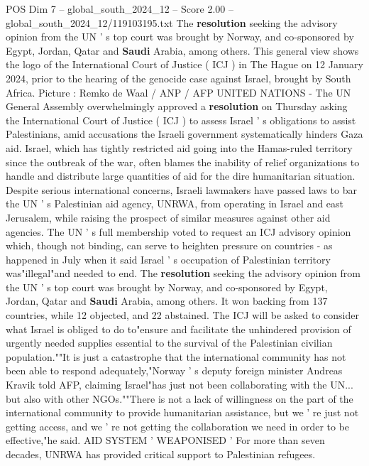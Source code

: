 \begin{textsample}{POS Dim 7 – global\_south\_2024\_12 – Score 2.00 – global\_south\_2024\_12/119103195.txt}  \label{ex:f7_pos_150}
The \textbf{resolution} seeking the advisory opinion from the UN ' s top court was brought by Norway, and co-sponsored by Egypt, Jordan, Qatar and \textbf{Saudi} Arabia, among others.
This general view shows the logo of the International Court of Justice ( ICJ ) in The Hague on 12 January 2024, prior to the hearing of the genocide case against Israel, brought by South Africa.
Picture : Remko de Waal / ANP / AFP UNITED NATIONS - The UN General Assembly overwhelmingly approved a \textbf{resolution} on Thursday asking the International Court of Justice ( ICJ ) to assess Israel ' s obligations to assist Palestinians, amid accusations the Israeli government systematically hinders Gaza aid.
Israel, which has tightly restricted aid going into the Hamas-ruled territory since the outbreak of the war, often blames the inability of relief organizations to handle and distribute large quantities of aid for the dire humanitarian situation.
Despite serious international concerns, Israeli lawmakers have passed laws to bar the UN ' s Palestinian aid agency, UNRWA, from operating in Israel and east Jerusalem, while raising the prospect of similar measures against other aid agencies.
The UN ' s full membership voted to request an ICJ advisory opinion which, though not binding, can serve to heighten pressure on countries - as happened in July when it said Israel ' s occupation of Palestinian territory was"illegal"and needed to end.
The \textbf{resolution} seeking the advisory opinion from the UN ' s top court was brought by Norway, and co-sponsored by Egypt, Jordan, Qatar and \textbf{Saudi} Arabia, among others.
It won backing from 137 countries, while 12 objected, and 22 abstained.
The ICJ will be asked to consider what Israel is obliged to do to"ensure and facilitate the unhindered provision of urgently needed supplies essential to the survival of the Palestinian civilian population.""It is just a catastrophe that the international community has not been able to respond adequately,"Norway ' s deputy foreign minister Andreas Kravik told AFP, claiming Israel"has just not been collaborating with the UN... but also with other NGOs.""There is not a lack of willingness on the part of the international community to provide humanitarian assistance, but we ' re just not getting access, and we ' re not getting the collaboration we need in order to be effective,"he said.
AID SYSTEM ' WEAPONISED ' For more than seven decades, UNRWA has provided critical support to Palestinian refugees.

\end{textsample}
